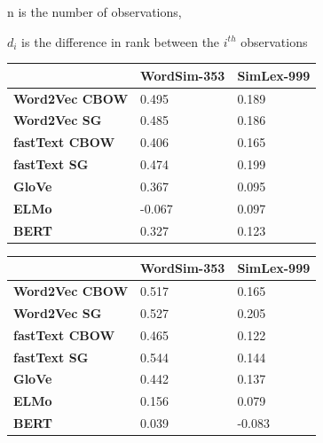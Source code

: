 \documentclass[format=acmsmall,review=true,screen=true]{acmart}
\begin{document}
    n is the number of observations,
    
    $ d_i $ is the difference in rank between the $ i^{th} $ observations
    
    \begin{table}[]
    \begin{tabular}{|l|l|l|}
    \hline
                           & \textbf{WordSim-353} & \textbf{SimLex-999}    \\
    \hline
    \textbf{Word2Vec CBOW} &         0.495             &      0.189                  \\
    \hline
    \textbf{Word2Vec SG}   &    0.485                  &    0.186                   \\
    \hline
    \textbf{fastText CBOW} &        0.406              &         0.165              \\
    \hline
    \textbf{fastText SG} &          0.474            &      0.199                  \\
    \hline
    \textbf{GloVe} &        0.367              &        0.095                \\
    \hline
    \textbf{ELMo} &         -0.067             &        0.097               \\
    \hline
    \textbf{BERT} &         0.327             &         0.123            \\
    \hline
    \end{tabular}
    \end{table}
    
    \begin{table}[]
    \begin{tabular}{|l|l|l|}
    \hline
                           & \textbf{WordSim-353} & \textbf{SimLex-999}    \\
    \hline
    \textbf{Word2Vec CBOW} &         0.517             &      0.165                  \\
    \hline
    \textbf{Word2Vec SG}   &    0.527                  &    0.205                   \\
    \hline
    \textbf{fastText CBOW} &        0.465              &         0.122              \\
    \hline
    \textbf{fastText SG} &          0.544            &      0.144                  \\
    \hline
    \textbf{GloVe} &        0.442              &        0.137                \\
    \hline
    \textbf{ELMo} &         0.156             &        0.079               \\
    \hline
    \textbf{BERT} &         0.039             &         -0.083            \\
    \hline
    \end{tabular}
    \end{table}
    
\end{document}
